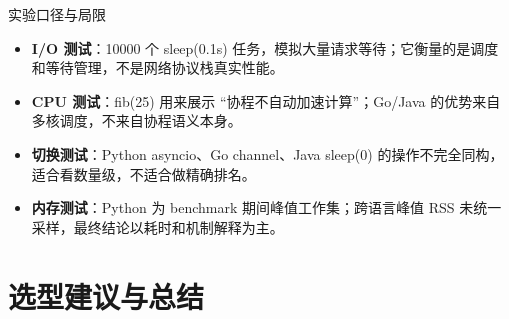 \documentclass[aspectratio=169, 10pt]{beamer}
\begin{document}
\begin{frame}{实验口径与局限}
  \small
  \begin{itemize}
    \item \textbf{I/O 测试}：10000 个 sleep(0.1s) 任务，模拟大量请求等待；它衡量的是调度和等待管理，不是网络协议栈真实性能。
    \item \textbf{CPU 测试}：fib(25) 用来展示 ``协程不自动加速计算''；Go/Java 的优势来自多核调度，不来自协程语义本身。
    \item \textbf{切换测试}：Python asyncio、Go channel、Java sleep(0) 的操作不完全同构，适合看数量级，不适合做精确排名。
    \item \textbf{内存测试}：Python 为 benchmark 期间峰值工作集；跨语言峰值 RSS 未统一采样，最终结论以耗时和机制解释为主。
  \end{itemize}
\end{frame}

\section{选型建议与总结}
\end{document}
